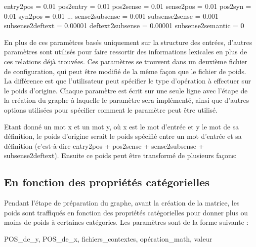 \documentclass[a4paper, 12pt]{article}
\begin{document}
\begin{framed}
entry2pos = 0.01\newline
pos2entry = 0.01\newline
pos2sense = 0.01\newline
sense2pos = 0.01\newline
pos2syn = 0.01\newline
syn2pos = 0.01\newline
...\newline
sense2subsense = 0.001\newline
subsense2sense = 0.001\newline
subsense2deftext = 0.00001\newline
deftext2subsense = 0.00001\newline
subsense2semantic = 0\newline
\end{framed}

En plus de ces paramètres basés uniquement sur la structure des entrées, d'autres paramètres sont utilisés pour faire ressortir des informations lexicales en plus de ces relations déjà trouvées. Ces paramètres se trouvent dans un deuxième fichier de configuration, qui peut être modifié de la même façon que le fichier de poids. La différence est que l'utilisateur peut spécifier le type d'opération à effectuer sur le poids d'origine. Chaque paramètre est écrit sur une seule ligne avec l'étape de la création du graphe à laquelle le paramètre sera implémenté, ainsi que d'autres options utilisées pour spécifier comment le paramètre peut être utilisé.

Etant donné un mot x et un mot y, où x est le mot d'entrée et y le mot de sa définition, le poids d'origine serait le poids spécifié entre un mot d'entrée et sa définition (c'est-à-dire entry2pos + pos2sense + sense2subsense + subsense2deftext). Ensuite ce poids peut être transformé de plusieurs façons:


\subsection{En fonction des propriétés catégorielles}
Pendant l'étape de préparation du graphe, avant la création de la matrice, les poids sont traffiqués en fonction des propriétés catégorielles pour donner plus ou moins de poids à certaines catégories. Les paramètres sont de la forme suivante :
    \begin{framed}
        POS\_de\_y, POS\_de\_x, fichiers\_contextes, opération\_math, valeur
    \end{framed}
\end{document}

